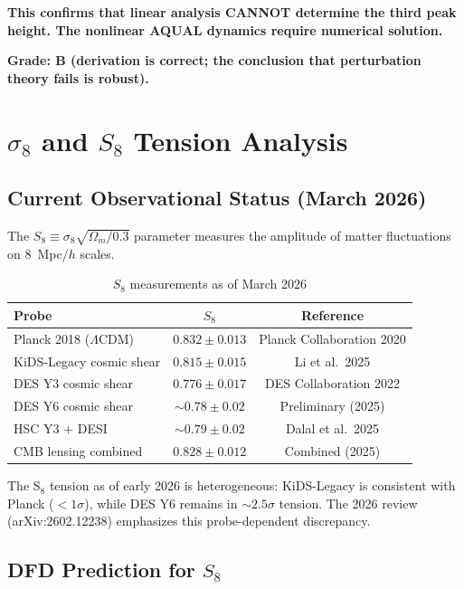 \documentclass[11pt]{article}
\newcommand{\LCDM}{$\Lambda$CDM}
\newcommand{\Om}{\Omega_m}
\begin{document}
\textbf{This confirms that linear analysis CANNOT determine the third
peak height.  The nonlinear AQUAL dynamics require numerical solution.}

\textbf{Grade: B (derivation is correct; the conclusion that
perturbation theory fails is robust).}

\section{$\sigma_8$ and $S_8$ Tension Analysis}
\label{sec:s8}

\subsection{Current Observational Status (March 2026)}

The $S_8 \equiv \sigma_8\sqrt{\Om/0.3}$ parameter measures the
amplitude of matter fluctuations on 8~Mpc/$h$ scales.

\begin{table}[H]
\centering
\caption{$S_8$ measurements as of March 2026}
\begin{tabular}{lcc}
\toprule
Probe & $S_8$ & Reference \\
\midrule
Planck 2018 (\LCDM) & $0.832 \pm 0.013$ & Planck Collaboration 2020 \\
KiDS-Legacy cosmic shear & $0.815 \pm 0.015$ & Li et al.\ 2025 \\
DES Y3 cosmic shear & $0.776 \pm 0.017$ & DES Collaboration 2022 \\
DES Y6 cosmic shear & $\sim 0.78 \pm 0.02$ & Preliminary (2025) \\
HSC Y3 + DESI & $\sim 0.79 \pm 0.02$ & Dalal et al.\ 2025 \\
CMB lensing combined & $0.828 \pm 0.012$ & Combined (2025) \\
\bottomrule
\end{tabular}
\end{table}

The S$_8$ tension as of early 2026 is heterogeneous:
KiDS-Legacy is consistent with Planck ($< 1\sigma$), while DES Y6
remains in $\sim 2.5\sigma$ tension.  The 2026 review
(arXiv:2602.12238) emphasizes this probe-dependent discrepancy.

\subsection{DFD Prediction for $S_8$}
\end{document}
